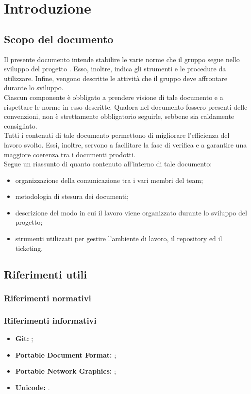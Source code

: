\section{Introduzione}
	\subsection{Scopo del documento}
		Il presente documento intende stabilire le varie norme che il gruppo \groupname{} segue nello sviluppo del progetto \projectname{}. Esso, inoltre, indica gli strumenti e le procedure da utilizzare. Infine, vengono descritte le attività che il gruppo deve affrontare durante lo sviluppo.\\
		Ciascun componente è obbligato a prendere visione di tale documento e a rispettare le norme in esso descritte. Qualora nel documento fossero presenti delle convenzioni, non è strettamente obbligatorio seguirle, sebbene sia caldamente consigliato.\\
		Tutti i contenuti di tale documento permettono di migliorare l’efficienza del lavoro svolto. Essi, inoltre, servono a facilitare la fase di verifica e a garantire una maggiore coerenza tra i documenti prodotti.\\
		Segue un riassunto di quanto contenuto all'interno di tale documento:
		\begin{itemize}
			\item organizzazione della comunicazione tra i vari membri del team;
			\item metodologia di stesura dei documenti;
			\item descrizione del modo in cui il lavoro viene organizzato durante lo sviluppo del progetto;
			\item strumenti utilizzati per gestire l'ambiente di lavoro, il repository ed il ticketing.
		\end{itemize}

	
	

	\subsection{Riferimenti utili}
		\subsubsection{Riferimenti normativi}
		\subsubsection{Riferimenti informativi}
			\begin{itemize}
				\item \textbf{Git:} ;
				\item \textbf{Portable Document Format:} ;
				\item \textbf{Portable Network Graphics:} ;
				\item \textbf{Unicode:} .
			\end{itemize}